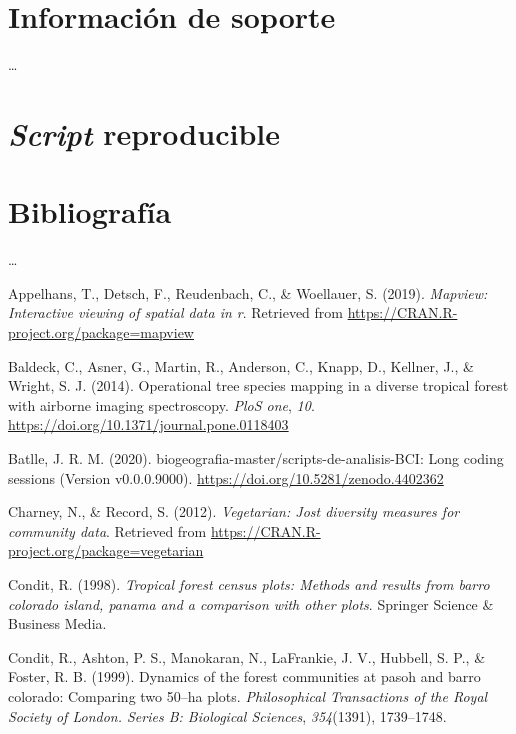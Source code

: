 \documentclass[11pt,]{article}
\begin{document}
\section{Información de soporte}\label{informaciuxf3n-de-soporte}

\ldots

\section{\texorpdfstring{\emph{Script}
reproducible}{Script reproducible}}\label{script-reproducible}

\section{Bibliografía}\label{bibliografuxeda}

\ldots

\hypertarget{refs}{}
\hypertarget{ref-mapview}{}
Appelhans, T., Detsch, F., Reudenbach, C., \& Woellauer, S. (2019).
\emph{Mapview: Interactive viewing of spatial data in r}. Retrieved from
\url{https://CRAN.R-project.org/package=mapview}

\hypertarget{ref-inproceedings}{}
Baldeck, C., Asner, G., Martin, R., Anderson, C., Knapp, D., Kellner,
J., \& Wright, S. J. (2014). Operational tree species mapping in a
diverse tropical forest with airborne imaging spectroscopy. \emph{PloS
one}, \emph{10}. \url{https://doi.org/10.1371/journal.pone.0118403}

\hypertarget{ref-jose_ramon_martinez_batlle_2020_4402362}{}
Batlle, J. R. M. (2020). biogeografia-master/scripts-de-analisis-BCI:
Long coding sessions (Version v0.0.0.9000).
\url{https://doi.org/10.5281/zenodo.4402362}

\hypertarget{ref-vegetarian}{}
Charney, N., \& Record, S. (2012). \emph{Vegetarian: Jost diversity
measures for community data}. Retrieved from
\url{https://CRAN.R-project.org/package=vegetarian}

\hypertarget{ref-condit1998tropical}{}
Condit, R. (1998). \emph{Tropical forest census plots: Methods and
results from barro colorado island, panama and a comparison with other
plots}. Springer Science \& Business Media.

\hypertarget{ref-condit1999dynamics}{}
Condit, R., Ashton, P. S., Manokaran, N., LaFrankie, J. V., Hubbell, S.
P., \& Foster, R. B. (1999). Dynamics of the forest communities at pasoh
and barro colorado: Comparing two 50--ha plots. \emph{Philosophical
Transactions of the Royal Society of London. Series B: Biological
Sciences}, \emph{354}(1391), 1739--1748.
\end{document}
